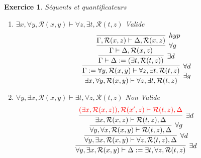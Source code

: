 \documentclass{article}
\theoremstyle{plain}
\newtheorem{exo}{Exercice}%
\begin{document}
\begin{exo} Séquents et quantificateurs
\begin{enumerate}
    \item $\exists x, \forall y, \mathcal{R}(x, y)
        \vdash \forall z, \exists t, \mathcal{R}(t, z)$ Valide
    \[
        \infer[\exists g]
             {\exists x, \forall y, \mathcal{R}(x, y) \vdash
             \forall z, \exists t, \mathcal{R}(t, z)}
        {\infer[\forall d]
               {\Gamma := \forall y, \mathcal{R}(x, y) \vdash \forall z, \exists t, \mathcal{R}(t, z)}
        {\infer[\exists d]{\Gamma \vdash \Delta := (\exists t, \mathcal{R}(t, z))}
        {\infer[\forall g]{\Gamma \vdash \Delta, \mathcal{R}(x, z)}
        {\infer[hyp]{\Gamma, \mathcal{R}(x, z) \vdash \Delta, \mathcal{R}(x, z)}
        {}}}}}
    \]
    \item $\forall y, \exists x, \mathcal{R}(x, y)
        \vdash \exists t, \forall z, \mathcal{R}(t, z)$ Non Valide
    \[
        \infer[\exists d]{\forall y, \exists x, \mathcal{R}(x, y)
                            \vdash \Delta := \exists t, \forall z, \mathcal{R}(t, z)}
        {\infer[\forall d]{\forall y, \exists x, \mathcal{R}(x, y)
            \vdash \forall z, \mathcal{R}(t, z), \Delta}
        {\infer[\forall g]{\forall y, \forall x, \mathcal{R}(x, y)\vdash \mathcal{R}(t, z), \Delta}
        {\infer[\exists d]{\exists x, \mathcal{R}(x, z) \vdash \mathcal{R}(t, z), \Delta}
        {\textcolor{red}
        {
            (\exists x, \mathcal{R}(x, z)), \mathcal{R}(x', z) \vdash \mathcal{R}(t, z), \Delta
        }}}}}
    \]
\end{enumerate}
\end{exo}
\end{document}
